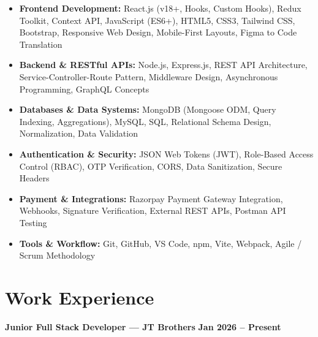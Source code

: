 \documentclass[a4paper,10pt]{article}
\begin{document}
\begin{itemize}

    \item \textbf{Frontend Development:}
    React.js (v18+, Hooks, Custom Hooks), Redux Toolkit, Context API,
    JavaScript (ES6+), HTML5, CSS3, Tailwind CSS, Bootstrap,
    Responsive Web Design, Mobile-First Layouts, Figma to Code Translation

    \item \textbf{Backend \& RESTful APIs:}
    Node.js, Express.js, REST API Architecture, Service-Controller-Route Pattern,
    Middleware Design, Asynchronous Programming, GraphQL Concepts

    \item \textbf{Databases \& Data Systems:}
    MongoDB (Mongoose ODM, Query Indexing, Aggregations), MySQL, SQL,
    Relational Schema Design, Normalization, Data Validation

    \item \textbf{Authentication \& Security:}
    JSON Web Tokens (JWT), Role-Based Access Control (RBAC),
    OTP Verification, CORS, Data Sanitization, Secure Headers

    \item \textbf{Payment \& Integrations:}
    Razorpay Payment Gateway Integration, Webhooks, Signature Verification,
    External REST APIs, Postman API Testing

    \item \textbf{Tools \& Workflow:}
    Git, GitHub, VS Code, npm, Vite, Webpack, Agile / Scrum Methodology

\end{itemize}

\section*{Work Experience}

\textbf{Junior Full Stack Developer --- JT Brothers}
\hfill
\textbf{Jan 2026 -- Present}
\end{document}
